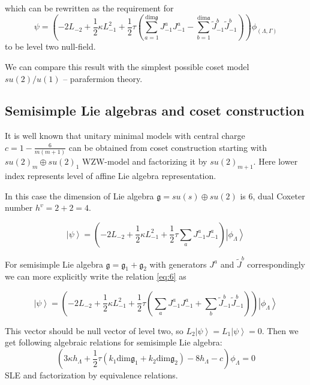 \documentclass[12pt]{article}
\theoremstyle{definition}
\newcommand{\gf}{\mathfrak{g}}
\newcommand{\af}{\mathfrak{a}}
\theoremstyle{definition} \newtheorem{Def}{Definition}
\begin{document}
which can be rewritten as the requirement for
\begin{equation*}
  \psi=\left(-2L_{-2}+\frac{1}{2}\kappa L_{-1}^{2}+\frac{1}{2}\tau \left(\sum_{a=1}^{\mathrm{dim}\gf}J^{a}_{-1}J^{a}_{-1}-\sum_{b=1}^{\mathrm{dim}\af}\tilde{J}^{b}_{-1}\tilde{J}^{b}_{-1}\right)\right) \phi_{(\Lambda,\Gamma)}
\end{equation*}
to be level two null-field.

We can compare this result with the simplest possible coset model $su(2)/u(1)$ --  parafermion theory.

\subsection{Semisimple Lie algebras and coset construction}
\label{sec:semis-lie-algebr}

It is well known that unitary minimal models with central charge $c=1-\frac{6}{m(m+1)}$ can be obtained from coset construction starting with $su(2)_{m}\oplus su(2)_{1}$ WZW-model and factorizing it by $su(2)_{m+1}$. Here lower index represents level of affine Lie algebra representation. 

In this case the dimension of Lie algebra $\gf=su(s)\oplus su(2)$ is 6, dual Coxeter number $h^{v}=2+2=4$. 


\begin{equation}
  \left| \psi\right>=\left(-2 L_{-2}+\frac{1}{2}\kappa L_{-1}^{2}+\frac{1}{2}\tau\sum_{a} J^{a}_{-1} J^{a}_{-1}\right) \left|\phi_{\Lambda}\right>    
\label{eq:6}
\end{equation}

For semisimple Lie algebra $\gf=\gf_{1}+\gf_{2}$ with generators $J^{a}$ and $\tilde{J}^{b}$ correspondingly we can more explicitly write the relation \eqref{eq:6} as 

\begin{equation*}
  \left| \psi\right>=\left(-2 L_{-2}+\frac{1}{2}\kappa L_{-1}^{2}+\frac{1}{2}\tau\left(\sum_{a} J^{a}_{-1} J^{a}_{-1}+\sum_{b}\tilde{J}^{b}_{-1}\tilde{J}^{b}_{-1}\right) \right) \left|\phi_{\Lambda}\right>    
\end{equation*}

This vector should be null vector of level two, so $L_{2}\left|\psi\right>=L_{1}\left|\psi\right>=0$. Then we get following algebraic relations for semisimple Lie algebra:
\begin{equation}
  \label{eq:7}
  \left( 3\kappa h_{\Lambda} +\frac{1}{2} \tau (k_{1} \mathrm{dim} \gf_{1}+k_{2}\mathrm{dim} \gf_{2}) -8 h_{\Lambda} - c\right)\phi_{\Lambda}=0
\end{equation}
SLE and factorization by equivalence relations. 
\end{document}
